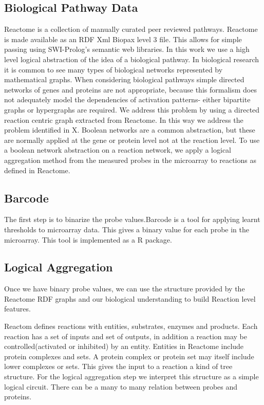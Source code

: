 \documentclass[runningheads,a4paper]{llncs}
\begin{document}
\subsection{Biological Pathway Data}
Reactome is a collection of manually curated peer reviewed pathways. Reactome is made available as an RDF Xml Biopax level 3 file. This allows for simple passing using SWI-Prolog's semantic web libraries. 
In this work we use a high level logical abstraction of the idea of a biological pathway. In biological research it is common to see many types of biological networks represented by mathematical graphs. When considering biological pathways simple directed networks of genes and proteins are not appropriate, because this formalism does not adequately model the dependencies of activation patterns- either bipartite graphs or hypergraphs are required. We address this problem by using a directed reaction centric graph extracted from Reactome. In this way we address the problem identified in X.  Boolean networks are a common abstraction, but these are normally applied at the gene or protein level not at the reaction level. To use a boolean network abstraction on a reaction network, we apply a logical aggregation method from the measured probes in the microarray to reactions as defined in Reactome. 
\subsection{Barcode}
The first step is to binarize the probe values.Barcode is a tool for applying learnt thresholds to microarray data. This gives a binary value for each probe in the microarray. This tool is implemented as a R package.
\subsection{Logical Aggregation} 
Once we have binary probe values, we can use the structure provided by
the Reactome RDF graphs and our biological understanding to build Reaction level features.
 
Reactom defines reactions with entities, substrates, enzymes and products.
Each reaction has a set of inputs and set of outputs, in addition a reaction may be controlled(activated or inhibited) by an entity. 
Entities in Reactome include protein complexes and sets. 
A protein complex or protein set may itself include lower complexes or sets. This gives the input to a reaction a kind of tree structure. For the logical aggregation step we interpret this structure as a simple logical circuit. There can be a many to many relation between probes and proteins. 
\end{document}
